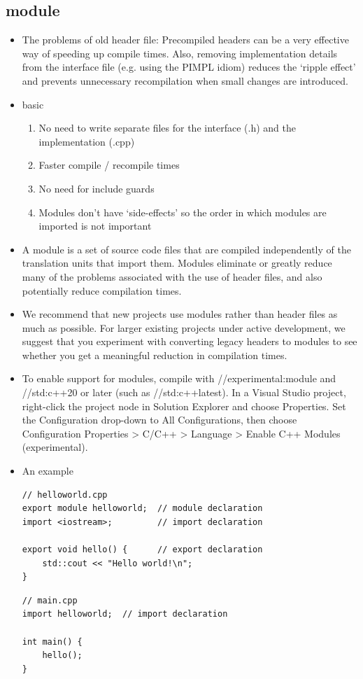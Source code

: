 \documentclass[a4paper,11pt,twoside]{book}
\begin{document}
\subsection{module}
\begin{itemize}
	
	\item The problems of old header file: Precompiled headers can be a very effective way of speeding up compile times. Also, removing implementation details from the interface file (e.g. using the PIMPL idiom) reduces the ‘ripple effect’ and prevents unnecessary recompilation when small changes are introduced.
	
	
	\item basic
	\begin{enumerate}
		\item No need to write separate files for the interface (.h) and the implementation (.cpp)
		\item Faster compile / recompile times
		\item No need for include guards	
		\item Modules don’t have ‘side-effects’ so the order in which modules are imported is not important
	\end{enumerate}
	

	
	\item A module is a set of source code files that are compiled independently of the translation units that import them. Modules eliminate or greatly reduce many of the problems associated with the use of header files, and also potentially reduce compilation times. 
	
	\item We recommend that new projects use modules rather than header files as much as possible. For larger existing projects under active development, we suggest that you experiment with converting legacy headers to modules to see whether you get a meaningful reduction in compilation times.
	
	\item To enable support for modules, compile with //experimental:module and //std:c++20 or later (such as //std:c++latest). In a Visual Studio project, right-click the project node in Solution Explorer and choose Properties. Set the Configuration drop-down to All Configurations, then choose Configuration Properties > C/C++ > Language > Enable C++ Modules (experimental).
	
	\item An example
\begin{lstlisting}
// helloworld.cpp
export module helloworld;  // module declaration
import <iostream>;         // import declaration

export void hello() {      // export declaration
	std::cout << "Hello world!\n";
}
\end{lstlisting}	

\begin{lstlisting}
// main.cpp
import helloworld;  // import declaration

int main() {
	hello();
}	
\end{lstlisting}
	
	
\end{itemize}
\end{document}
